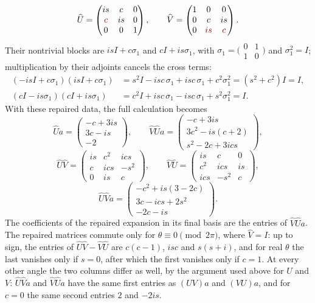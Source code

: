 \[
\widehat U=\begin{pmatrix}is&c&0\\\erratum{c}&is&0\\0&0&1\end{pmatrix},\qquad
\widehat V=\begin{pmatrix}1&0&0\\0&c&is\\0&\erratum{is}&\erratum{c}\end{pmatrix}.
\]
Their nontrivial blocks are $isI+c\sigma_1$ and $cI+is\sigma_1$, with
$\sigma_1=\bigl(\begin{smallmatrix}0&1\\1&0\end{smallmatrix}\bigr)$ and
$\sigma_1^2=I$; multiplication by their adjoints cancels the cross
terms:
\begin{align*}
(-isI+c\sigma_1)(isI+c\sigma_1)
&=s^2I-isc\,\sigma_1+isc\,\sigma_1+c^2\sigma_1^2=(s^2+c^2)I=I,\\
(cI-is\sigma_1)(cI+is\sigma_1)
&=c^2I+isc\,\sigma_1-isc\,\sigma_1+s^2\sigma_1^2=I.
\end{align*}
With these repaired data, the full calculation becomes
\[
\widehat Ua=\begin{pmatrix}-c+3is\\3c-is\\-2\end{pmatrix},\qquad
\widehat V\widehat Ua=\begin{pmatrix}
-c+3is\\3c^2-is(c+2)\\s^2-2c+3ics
\end{pmatrix},
\]
\[
\widehat U\widehat V=\begin{pmatrix}is&c^2&ics\\c&ics&-s^2\\0&is&c\end{pmatrix},
\qquad
\widehat V\widehat U=\begin{pmatrix}is&c&0\\c^2&ics&is\\ics&-s^2&c\end{pmatrix},
\]
\[
\widehat U\widehat Va=\begin{pmatrix}
-c^2+is(3-2c)\\3c-ics+2s^2\\-2c-is
\end{pmatrix}.
\]
The coefficients of the repaired expansion in its final basis are the
entries of $\widehat V\widehat Ua$. The repaired matrices commute only
for $\theta\equiv0\pmod{2\pi}$, where $\widehat V=I$: up to sign, the
entries of $\widehat U\widehat V-\widehat V\widehat U$ are $c(c-1)$,
$isc$ and $s(s+i)$, and for real $\theta$ the last vanishes only if
$s=0$, after which the first vanishes only if $c=1$. At every other
angle the two columns differ as well, by the argument used above for
$U$ and $V$: $\widehat U\widehat Va$ and $\widehat V\widehat Ua$ have
the same first entries as $(UV)a$ and $(VU)a$, and for $c=0$ the same
second entries $2$ and $-2is$.


